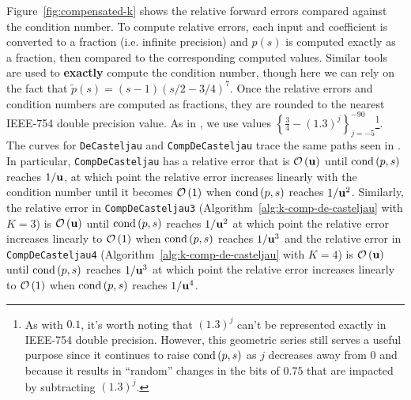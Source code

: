 Figure~\ref{fig:compensated-k} shows the relative forward errors compared
against the condition number. To compute relative errors, each input and
coefficient is converted to a fraction (i.e. infinite precision) and
\(p(s)\) is computed exactly as a fraction, then
compared to the corresponding computed values. Similar tools are used to
\textbf{exactly} compute the condition number, though here we can rely
on the fact that \(\widetilde{p}(s) = (s - 1)
\left(s/2 - 3/4\right)^7\). Once the relative errors and
condition numbers are computed as fractions, they are rounded to the
nearest IEEE-754 double precision value. As in \cite{Jiang2010}, we use
values \(\left\{\frac{3}{4} - (1.3)^j\right\}_{j=-5}^{-90}\)\footnote{As with
\(0.1\), it's worth noting that \((1.3)^j\) can't be represented exactly in
IEEE-754 double precision. However, this geometric series still serves a
useful purpose since it continues to raise \(\operatorname{cond}\left(p, s\right)\) as \(j\) decreases
away from \(0\) and because it results in ``random'' changes in the bits of
\(0.75\) that are impacted by subtracting \((1.3)^j\).}. The curves for
\texttt{DeCasteljau} and \texttt{CompDeCasteljau} trace the same paths seen
in \cite{Jiang2010}. In particular, \texttt{CompDeCasteljau} has a relative
error that is \(\mathcal{O}\left(\mathbf{u}\right)\) until \(\operatorname{cond}\left(p, s\right)\) reaches
\(1 / \mathbf{u}\), at which point the relative error increases linearly with
the condition number until it becomes \(\mathcal{O}\left(1\right)\) when
\(\operatorname{cond}\left(p, s\right)\) reaches \(1 / \mathbf{u}^2\).
Similarly, the relative error in \texttt{CompDeCasteljau3}
(Algorithm~\ref{alg:k-comp-de-casteljau} with \(K = 3\))
is \(\mathcal{O}\left(\mathbf{u}\right)\) until \(\operatorname{cond}\left(p, s\right)\) reaches
\(1 / \mathbf{u}^2\) at which point the relative error increases linearly
to \(\mathcal{O}\left(1\right)\) when \(\operatorname{cond}\left(p, s\right)\) reaches \(1 / \mathbf{u}^3\)
and the relative error in \texttt{CompDeCasteljau4}
(Algorithm~\ref{alg:k-comp-de-casteljau} with \(K = 4\))
is \(\mathcal{O}\left(\mathbf{u}\right)\) until \(\operatorname{cond}\left(p, s\right)\) reaches
\(1 / \mathbf{u}^3\) at which point the relative error increases linearly
to \(\mathcal{O}\left(1\right)\) when \(\operatorname{cond}\left(p, s\right)\) reaches \(1 / \mathbf{u}^4\).
